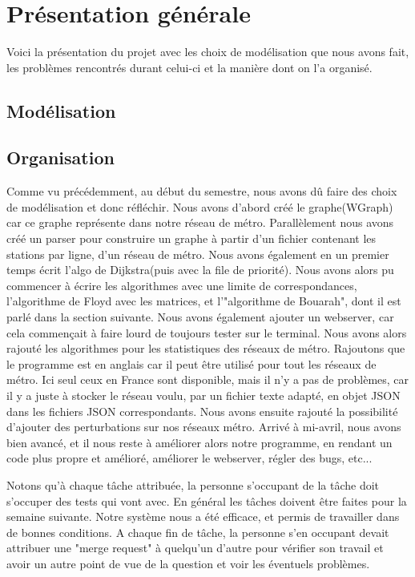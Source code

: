 \documentclass[french, 12pt]{article}
\begin{document}
\section{Présentation générale}
Voici la présentation du projet avec les choix de modélisation que nous avons fait, les problèmes rencontrés durant celui-ci et la manière dont on l'a organisé.
\subsection{Modélisation}

\subsection{Organisation}
Comme vu précédemment, au début du semestre, nous avons dû faire des choix de modélisation et donc réfléchir. Nous avons d'abord créé le graphe(W\-Graph) car ce graphe représente dans notre réseau de métro.
Parallèlement nous avons créé un parser pour construire un graphe à partir d'un fichier contenant les stations par ligne, d'un réseau de métro.
Nous avons également en un premier temps écrit l'algo de Dijkstra(puis avec la file de priorité).
Nous avons alors pu commencer à écrire les algorithmes avec une limite de correspondances, l'algorithme de Floyd avec les matrices, et l'"algorithme de Bouarah", dont il est parlé dans la section suivante.
Nous avons également ajouter un webserver, car cela commençait à faire lourd de toujours tester sur le terminal.
Nous avons alors rajouté les algorithmes pour les statistiques des réseaux de métro.
Rajoutons que le programme est en anglais car il peut être utilisé pour tout les réseaux de métro. Ici seul ceux en France sont disponible, mais il n'y a pas de problèmes, car il y a juste à stocker le réseau voulu, par un fichier texte adapté, en objet JSON dans les fichiers JSON correspondants.
Nous avons ensuite rajouté la possibilité d'ajouter des perturbations sur nos réseaux métro.
Arrivé à mi-avril, nous avons bien avancé, et il nous reste à améliorer alors notre programme, en rendant un code plus propre et amélioré, améliorer le webserver, régler des bugs, etc...

Notons qu'à chaque tâche attribuée, la personne s'occupant de la tâche doit s'occuper des tests qui vont avec. En général les tâches doivent être faites pour la semaine suivante.
Notre système nous a été efficace, et permis de travailler dans de bonnes conditions.
A chaque fin de tâche, la personne s'en occupant devait attribuer une "merge request" à quelqu'un d'autre pour vérifier son travail et avoir un autre point de vue de la question et voir les éventuels problèmes.
\end{document}
